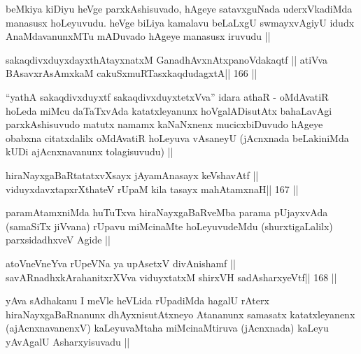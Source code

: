 \begin{artha}
beMkiya kiDiyu heVge parxkAshisuvado, hAgeye satavxguNada
uderxVkadiMda manasusx hoLeyuvudu. heVge biLiya kamalavu beLaLxgU
swmayxvAgiyU idudx AnaMdavanunxMTu mADuvado hAgeye manasusx iruvudu ||
\end{artha}

\begin{shl}
sakaqdivxduyxdayxthA\s tayxnatxM GanadhAvxnAtxpanoVdakaqtf ||
atiVva BAsavxrA\s sAmxkaM cakuSxmuRTasxkaqdudagxtA\hfill || 166 ||
\end{shl}

\begin{artha}
``yathA sakaqdivxduyxtf sakaqdivxduyxtetxVva'' idara athaR -
oMdAvatiR hoLeda miMcu daTaTxvAda katatxleyanunx hoVgalADisutAtx
bahaLavAgi parxkAshisuvudo matutx namamx kaNaNxnenx mucicxbiDuvudo
hAgeye obabxna citatxdalilx oMdAvatiR hoLeyuva vAsaneyU (jAcnxnada
beLakiniMda kUDi ajAcnxnavanunx tolagisuvudu) ||
\end{artha}


\begin{shl}
hiraNayxgaBaRtatatxvXsayx jAyamAnasayx keVshavAtf ||
viduyxdavxtapxrXthateV rUpaM kila tasayx mahAtamxnaH\hfill || 167 ||
\end{shl}

\begin{artha}
paramAtamxniMda huTuTxva hiraNayxgaBaRveMba parama pUjayxvAda
(samaSiTx jiVvana) rUpavu miMcinaMte hoLeyuvudeMdu (shurxtigaLalilx)
parxsidadhxveV Agide ||
\end{artha}


\begin{shl}
atoV\s neVneYva rUpeVNa ya upAsetxV divAnishamf ||
savARnadhxkArahanitxrXVva viduyxtatxM shirxVH sadA\s\s sharxyeVtf\hfill || 168 ||
\end{shl}

\begin{artha}
yAva sAdhakanu I meVle heVLida rUpadiMda hagalU rAterx
hiraNayxgaBaRnanunx dhAyxnisutAtxneyo Atananunx samasatx katatxleyanenx
(ajAcnxnavanenxV) kaLeyuvaMtaha miMcinaMtiruva (jAcnxnada) kaLeyu
yAvAgalU Asharxyisuvadu ||
\end{artha}


